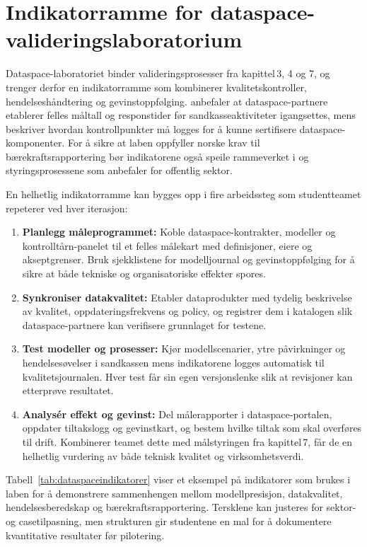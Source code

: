 \section{Indikatorramme for dataspace-valideringslaboratorium}
Dataspace-laboratoriet binder valideringsprosesser fra kapittel\,3, 4 og 7, og trenger derfor en indikatorramme som kombinerer kvalitetskontroller, hendelseshåndtering og gevinstoppfølging. \citet{digdir2024datasamarbeid} anbefaler at dataspace-partnere etablerer felles måltall og responstider før sandkasseaktiviteter igangsettes, mens \citet{idsa2023operational} beskriver hvordan kontrollpunkter må logges for å kunne sertifisere dataspace-komponenter. For å sikre at laben oppfyller norske krav til bærekraftsrapportering bør indikatorene også speile rammeverket i \citet{efrag2023esrs} og styringsprosessene som \citet{dfo2023baerekraft} anbefaler for offentlig sektor.

En helhetlig indikatorramme kan bygges opp i fire arbeidssteg som studentteamet repeterer ved hver iterasjon:
\begin{enumerate}
    \item \textbf{Planlegg måleprogrammet:} Koble dataspace-kontrakter, modeller og kontrolltårn-panelet til et felles målekart med definisjoner, eiere og akseptgrenser. Bruk sjekklistene for modelljournal og gevinstoppfølging for å sikre at både tekniske og organisatoriske effekter spores.\citep{digdir2023modelljournal,digdir2022gevinst}
    \item \textbf{Synkroniser datakvalitet:} Etabler dataprodukter med tydelig beskrivelse av kvalitet, oppdateringsfrekvens og policy, og registrer dem i katalogen slik dataspace-partnere kan verifisere grunnlaget for testene.\citep{dssc2024dataproducts}
    \item \textbf{Test modeller og prosesser:} Kjør modellscenarier, ytre påvirkninger og hendelsesøvelser i sandkassen mens indikatorene logges automatisk til kvalitetsjournalen. Hver test får sin egen versjonslenke slik at revisjoner kan etterprøve resultatet.\citep{idsa2023operational}
    \item \textbf{Analysér effekt og gevinst:} Del målerapporter i dataspace-portalen, oppdater tiltakslogg og gevinstkart, og bestem hvilke tiltak som skal overføres til drift. Kombinerer teamet dette med målstyringen fra kapittel\,7, får de en helhetlig vurdering av både teknisk kvalitet og virksomhetsverdi.\citep{digdir2022gevinst}
\end{enumerate}

Tabell~\ref{tab:dataspaceindikatorer} viser et eksempel på indikatorer som brukes i laben for å demonstrere sammenhengen mellom modellpresisjon, datakvalitet, hendelsesberedskap og bærekraftsrapportering. Tersklene kan justeres for sektor- og casetilpasning, men strukturen gir studentene en mal for å dokumentere kvantitative resultater før pilotering.

